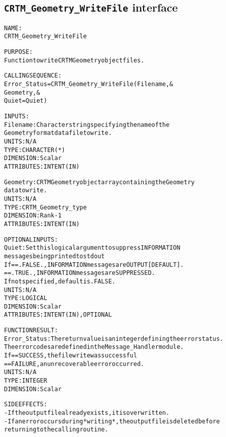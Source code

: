 \subsection{\texttt{CRTM\_Geometry\_WriteFile} interface}
  \label{sec:CRTM_Geometry_WriteFile_interface}
  \begin{alltt}
 
  NAME:
        CRTM_Geometry_WriteFile
 
  PURPOSE:
        Function to write CRTM Geometry object files.
 
  CALLING SEQUENCE:
        Error_Status = CRTM_Geometry_WriteFile( Filename     , &
                                                Geometry     , &
                                                Quiet = Quiet  )
 
  INPUTS:
        Filename:     Character string specifying the name of the
                      Geometry format data file to write.
                      UNITS:      N/A
                      TYPE:       CHARACTER(*)
                      DIMENSION:  Scalar
                      ATTRIBUTES: INTENT(IN)
 
        Geometry:     CRTM Geometry object array containing the Geometry
                      data to write.
                      UNITS:      N/A
                      TYPE:       CRTM_Geometry_type
                      DIMENSION:  Rank-1
                      ATTRIBUTES: INTENT(IN)
 
  OPTIONAL INPUTS:
        Quiet:        Set this logical argument to suppress INFORMATION
                      messages being printed to stdout
                      If == .FALSE., INFORMATION messages are OUTPUT [DEFAULT].
                         == .TRUE.,  INFORMATION messages are SUPPRESSED.
                      If not specified, default is .FALSE.
                      UNITS:      N/A
                      TYPE:       LOGICAL
                      DIMENSION:  Scalar
                      ATTRIBUTES: INTENT(IN), OPTIONAL
 
  FUNCTION RESULT:
        Error_Status: The return value is an integer defining the error status.
                      The error codes are defined in the Message_Handler module.
                      If == SUCCESS, the file write was successful
                         == FAILURE, an unrecoverable error occurred.
                      UNITS:      N/A
                      TYPE:       INTEGER
                      DIMENSION:  Scalar
 
  SIDE EFFECTS:
        - If the output file already exists, it is overwritten.
        - If an error occurs during *writing*, the output file is deleted before
          returning to the calling routine.
 
  \end{alltt}
